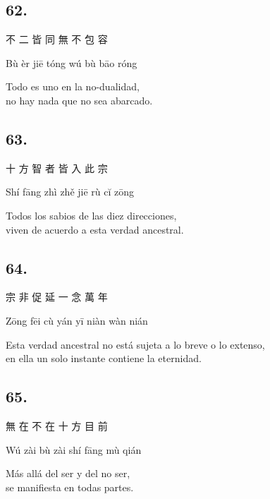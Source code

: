 \documentclass[
  a5paperpaper,
]{article}
\begin{document}
\begin{verseblock}

\hypertarget{section-136}{%
\subsection{62.}\label{section-136}}

不 二 皆 同 無 不 包 容

Bù èr jiē tóng wú bù bāo róng

Todo es uno en la no-dualidad,\\
no hay nada que no sea abarcado.

\end{verseblock}

\begin{verseblock}

\hypertarget{section-137}{%
\subsection{63.}\label{section-137}}

十 方 智 者 皆 入 此 宗

Shí fāng zhì zhě jiē rù cĭ zōng

Todos los sabios de las diez direcciones,\\
viven de acuerdo a esta verdad ancestral.

\end{verseblock}

\begin{verseblock}

\hypertarget{section-138}{%
\subsection{64.}\label{section-138}}

宗 非 促 延 一 念 萬 年

Zōng fēi cù yán yī niàn wàn nián

Esta verdad ancestral no está sujeta a lo breve o lo extenso,\\
en ella un solo instante contiene la eternidad.

\end{verseblock}

\begin{verseblock}

\hypertarget{section-139}{%
\subsection{65.}\label{section-139}}

無 在 不 在 十 方 目 前

Wú zài bù zài shí fāng mù qián

Más allá del ser y del no ser,\\
se manifiesta en todas partes.

\end{verseblock}
\end{document}
